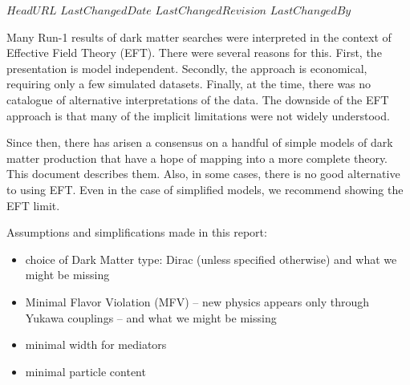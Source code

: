 \svnidlong
{$HeadURL$}
{$LastChangedDate$}
{$LastChangedRevision$}
{$LastChangedBy$}

Many Run-1 results of dark matter searches were interpreted in the
context of Effective Field Theory (EFT).  There were several reasons
for this.  First, the presentation is model independent.   Secondly,
the approach is economical, requiring only a few simulated datasets.
Finally, at the time, there was no catalogue of alternative
interpretations of the data.   The downside of the EFT approach is that
many of the implicit limitations were not widely understood.

Since then, there has arisen a consensus on a handful of simple models
of dark matter production that have a hope of mapping into a more
complete theory.  This document describes them.  Also, in some cases,
there is no good alternative to using EFT.  Even in the case of simplified
models, we recommend showing the EFT limit.

Assumptions and simplifications made in this report:
\begin{itemize}
 \item choice of Dark Matter type: Dirac (unless specified otherwise) and what we might be missing
 \item Minimal Flavor Violation (MFV) -- new physics appears only through Yukawa couplings -- and what we might be missing
 \item minimal width for mediators
 \item minimal particle content
\end{itemize}
